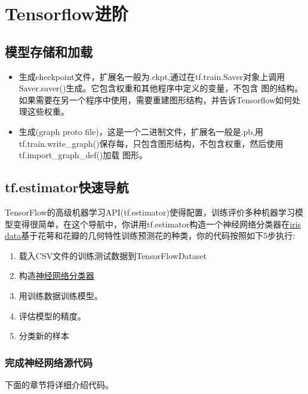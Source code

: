 \chapter{Tensorflow进阶}
\section{模型存储和加载}
\begin{itemize}
\item 生成checkpoint文件，扩展名一般为.ckpt,通过在tf.train.Saver对象上调用Saver.saver()生成。它包含权重和其他程序中定义的变量，不包含
图的结构。如果需要在另一个程序中使用，需要重建图形结构，并告诉Tensorflow如何处理这些权重。
\item 生成(graph proto file)，这是一个二进制文件，扩展名一般是.pb,用tf.train.write\_graph()保存每，只包含图形结构，不包含权重，然后使用tf.import\_graph\_def()加载
图形。
\end{itemize}
\section{tf.estimator快速导航}
TensorFlow的高级机器学习API(tf.estimator)使得配置，训练评价多种机器学习模型变得很简单，在这个导航中，你讲用tf.estimator构造一个神经网络分类器在\href{https://en.wikipedia.org/wiki/Iris_flower_data_set}{iris data}基于花萼和花瓣的几何特性训练预测花的种类，你的代码按照如下5步执行:
\begin{enumerate}
    \item 载入CSV文件的训练测试数据到TensorFlowDataset
    \item 构造\href{https://www.tensorflow.org/api_docs/python/tf/estimator/DNNClassifier}{神经网络分类器}
    \item 用训练数据训练模型。
    \item 评估模型的精度。
    \item 分类新的样本
\end{enumerate}
\subsection{完成神经网络源代码}

下面的章节将详细介绍代码。
